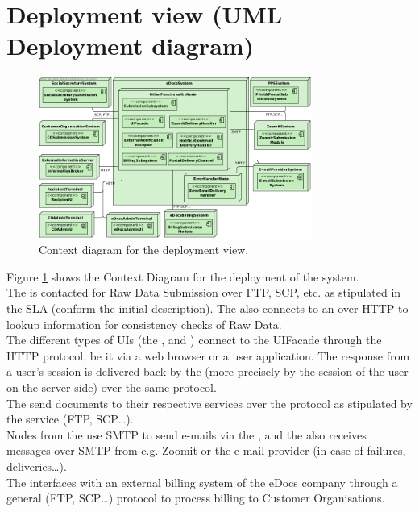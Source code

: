 \section{Deployment view (UML Deployment diagram)}\label{sec:deployment}

\begin{figure}
    \centering
    \includegraphics[width=0.8\textwidth]{figures/Deployment Context.png}
    \caption{Context diagram for the deployment view.}\label{fig:depl_context}
\end{figure}

Figure \ref{fig:depl_context} shows the Context Diagram for the deployment of the system.\\
The  is contacted for Raw Data Submission over FTP, SCP, etc. as stipulated in the SLA (conform the initial description). The  also connects to an  over HTTP to lookup information for consistency checks of Raw Data.\\
The different types of UIs (the ,  and ) connect to the UIFacade through the HTTP protocol, be it via a web browser or a user application. The response from a user's session is delivered back by the  (more precisely by the session of the user on the server side) over the same protocol.\\
The  send documents to their respective services over the protocol as stipulated by the service (FTP, SCP\ldots).\\
Nodes from the  use SMTP to send e-mails via the , and the  also receives messages over SMTP from e.g. Zoomit or the e-mail provider (in case of failures, deliveries\ldots).\\
The  interfaces with an external billing system of the eDocs company through a general (FTP, SCP\ldots) protocol to process billing to Customer Organisations.\\

